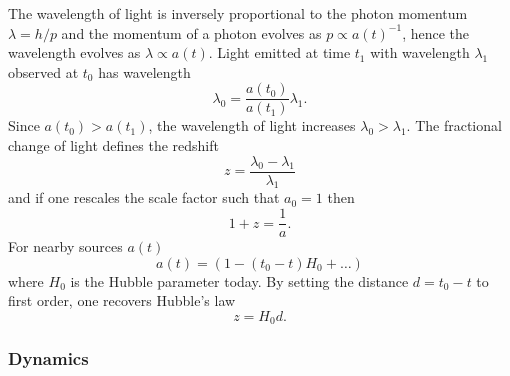 The wavelength of light is inversely proportional to the photon momentum \(\lambda = h/p\) and the momentum of a photon evolves as \(p \propto {a(t)}^{-1}\), hence the wavelength evolves as \(\lambda \propto a(t)\).
Light emitted at time \(t_{1}\) with wavelength \(\lambda_{1}\) observed at \(t_{0}\) has wavelength
%
\begin{equation}
	\lambda_{0}
    = \frac{a(t_{0})}{a(t_{1})} \lambda_{1}.
\end{equation}
%
Since \(a(t_{0}) > a(t_{1})\), the wavelength of light increases \(\lambda_{0} > \lambda_{1}\).
The fractional change of light defines the redshift
%
\begin{equation}
	z
    = \frac{\lambda_{0} - \lambda_{1}}{\lambda_{1}}
\end{equation}
%
and if one rescales the scale factor such that \(a_{0}=1\) then
%
\begin{equation}
	1 + z
    = \frac{1}{a}.
\end{equation}
%
For nearby sources \(a(t)\)
%
\begin{equation}
	a(t)
    = (1 - (t_{0} - t)H_{0} + \ldots)
\end{equation}
%
where \(H_{0}\) is the Hubble parameter today.
By setting the distance \(d = t_{0} - t\) to first order, one recovers Hubble's law
%
\begin{equation}
	z
    = H_{0}d.
\end{equation}

\subsubsection{Dynamics}

